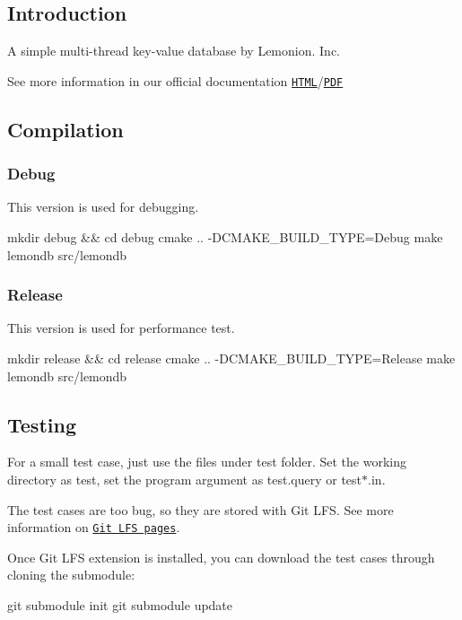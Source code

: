 \subsection*{Introduction}

A simple multi-\/thread key-\/value database by Lemonion. Inc.

See more information in our official documentation \href{https://tc-imba.github.io/VE482-p2/}{\tt H\+T\+ML}/\href{../latex/refman.pdf}{\tt P\+DF}

\subsection*{Compilation}

\subsubsection*{Debug}

This version is used for debugging. 
\begin{DoxyCode}
mkdir debug && cd debug
cmake ..  -DCMAKE\_BUILD\_TYPE=Debug
make lemondb
src/lemondb
\end{DoxyCode}


\subsubsection*{Release}

This version is used for performance test. 
\begin{DoxyCode}
mkdir release && cd release
cmake ..  -DCMAKE\_BUILD\_TYPE=Release
make lemondb
src/lemondb
\end{DoxyCode}


\subsection*{Testing}

For a small test case, just use the files under {\ttfamily test} folder. Set the working directory as {\ttfamily test}, set the program argument as {\ttfamily test.\+query} or {\ttfamily test$\ast$.in}.

The test cases are too bug, so they are stored with Git L\+FS. See more information on \href{https://git-lfs.github.com/}{\tt Git L\+FS pages}.

Once Git L\+FS extension is installed, you can download the test cases through cloning the submodule\+: 
\begin{DoxyCode}
git submodule init
git submodule update
\end{DoxyCode}


